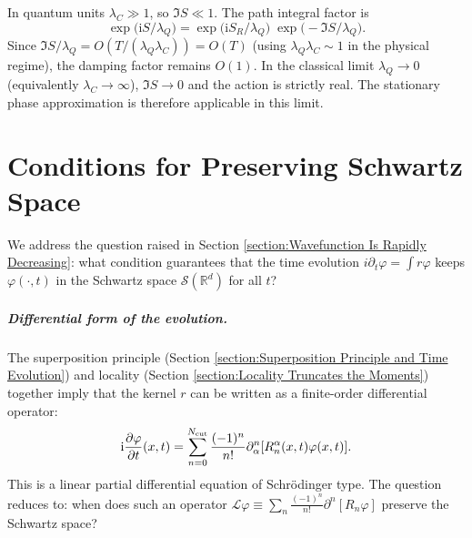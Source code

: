 \documentclass{book}
\newcommand{\mathi}{\mathrm{i}}
\newcommand{\tmop}[1]{\ensuremath{\operatorname{#1}}}
\begin{document}
In quantum units $\lambda_C \gg 1$, so $\Im S \ll 1$.  The path integral
factor is
\[ \exp \bigl( \mathi S / \lambda_Q \bigr) = \exp \bigl( \mathi S_R
   / \lambda_Q \bigr) \; \exp \bigl( - \Im S / \lambda_Q \bigr) . \]
Since $\Im S / \lambda_Q = O (T / (\lambda_Q \lambda_C)) = O (T)$ (using
$\lambda_Q \lambda_C \sim 1$ in the physical regime), the damping factor
remains $O (1)$.  In the classical limit $\lambda_Q \to 0$ (equivalently
$\lambda_C \to \infty$), $\Im S \to 0$ and the action is strictly real.
The stationary phase approximation is therefore applicable in this
limit.

\chapter{Conditions for Preserving Schwartz
Space}\label{appendix:schwartz-preserve}

We address the question raised in Section \ref{section:Wavefunction Is
Rapidly Decreasing}: what condition guarantees that the time evolution
$i \partial_t \varphi = \int r \varphi$ keeps $\varphi (\cdot, t)$ in the
Schwartz space $\mathcal{S} (\mathbb{R}^d)$ for all $t$?

\paragraph{Differential form of the evolution.}
The superposition principle (Section \ref{section:Superposition Principle
and Time Evolution}) and locality (Section \ref{section:Locality Truncates
the Moments}) together imply that the kernel $r$ can be written as a
finite-order differential operator:
\begin{equation}
  \mathi \frac{\partial \varphi}{\partial t}  (x, t) = \sum_{n =
  0}^{N_{\tmop{cut}}} \frac{(- 1)^n}{n!} \partial_{\alpha}^n
  [{\color[HTML]{000000}R^{\alpha}_n  (x, t)} \varphi (x, t)] .
  \label{eq:diff-evolution}
\end{equation}
This is a linear partial differential equation of Schrödinger type. The
question reduces to: when does such an operator $\mathcal{L} \varphi \equiv
\sum_n \frac{(-1)^n}{n!} \partial^n [R_n \varphi]$ preserve the Schwartz
space?
\end{document}

